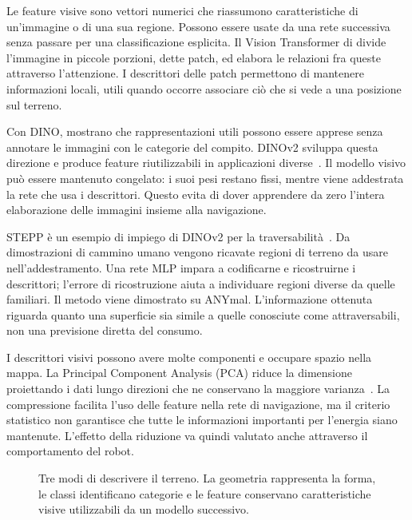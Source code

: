 Le feature visive sono vettori numerici che riassumono caratteristiche di un'immagine o di una sua regione. Possono essere usate da una rete successiva senza passare per una classificazione esplicita. Il Vision Transformer di \citet{Dosovitskiy2021ViT} divide l'immagine in piccole porzioni, dette patch, ed elabora le relazioni fra queste attraverso l'attenzione. I descrittori delle patch permettono di mantenere informazioni locali, utili quando occorre associare ciò che si vede a una posizione sul terreno.

Con DINO, \citet{Caron2021DINO} mostrano che rappresentazioni utili possono essere apprese senza annotare le immagini con le categorie del compito. DINOv2 sviluppa questa direzione e produce feature riutilizzabili in applicazioni diverse~\citep{Oquab2023DINOv2}. Il modello visivo può essere mantenuto congelato: i suoi pesi restano fissi, mentre viene addestrata la rete che usa i descrittori. Questo evita di dover apprendere da zero l'intera elaborazione delle immagini insieme alla navigazione.

STEPP è un esempio di impiego di DINOv2 per la traversabilità~\citep{Aegidius2025STEPP}. Da dimostrazioni di cammino umano vengono ricavate regioni di terreno da usare nell'addestramento. Una rete MLP impara a codificarne e ricostruirne i descrittori; l'errore di ricostruzione aiuta a individuare regioni diverse da quelle familiari. Il metodo viene dimostrato su ANYmal. L'informazione ottenuta riguarda quanto una superficie sia simile a quelle conosciute come attraversabili, non una previsione diretta del consumo.

I descrittori visivi possono avere molte componenti e occupare spazio nella mappa. La Principal Component Analysis (PCA) riduce la dimensione proiettando i dati lungo direzioni che ne conservano la maggiore varianza~\citep{Jolliffe2016PCA}. La compressione facilita l'uso delle feature nella rete di navigazione, ma il criterio statistico non garantisce che tutte le informazioni importanti per l'energia siano mantenute. L'effetto della riduzione va quindi valutato anche attraverso il comportamento del robot.

\begin{figure}[tbp]
    \centering
    \caption[Geometria, semantica e feature per la navigazione]{Tre modi di descrivere il terreno. La geometria rappresenta la forma, le classi identificano categorie e le feature conservano caratteristiche visive utilizzabili da un modello successivo.}
    \label{fig:sota-rappresentazioni}
\end{figure}

